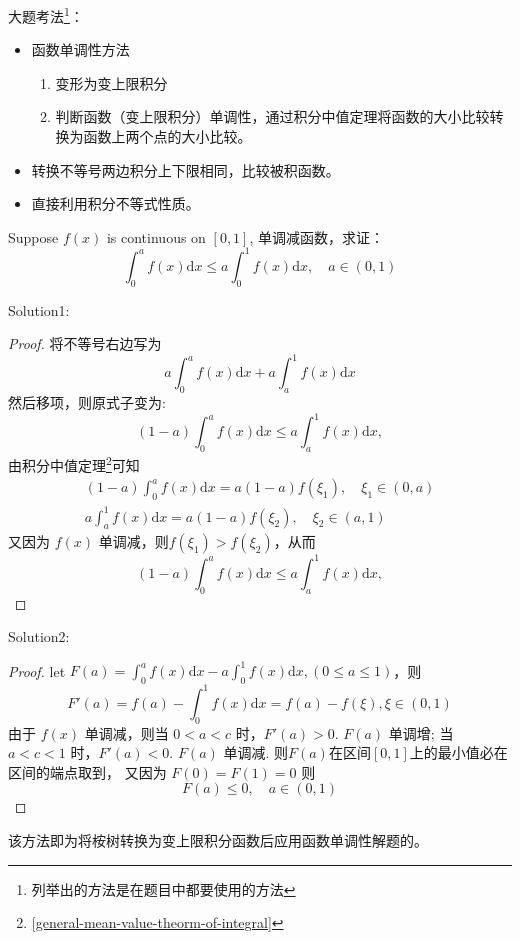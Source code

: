 大题考法\footnote{列举出的方法是在题目中都要使用的方法}：
\begin{itemize}
    \item 函数单调性方法
        \begin{enumerate}
            \item 变形为变上限积分
            \item 判断函数（变上限积分）单调性，通过积分中值定理将函数的大小比较转换为函数上两个点的大小比较。
        \end{enumerate}
    \item 转换不等号两边积分上下限相同，比较被积函数。
    \item 直接利用积分不等式性质。
\end{itemize}

\begin{example}
    Suppose $f(x)$ is continuous on $[0,1]$, 单调减函数，求证：
    \[
        \int_0^a f(x) \mathrm{d}x \leq a \int_0^1 f(x) \mathrm{d}x, \quad a \in (0, 1)
    \]
    \cite[page 119, pdf 130, example 2]{we}

    Solution1:
    \begin{proof}
        将不等号右边写为
        \[
            a\int_0^a f(x) \mathrm{d}x + a\int_a^1 f(x) \mathrm{d}x
        \]
        然后移项，则原式子变为:
        \[
            (1-a) \int_0^a f(x) \mathrm{d}x \leq a \int_a^1 f(x) \mathrm{d}x,
        \]
        由积分中值定理\footnote{\ref{general-mean-value-theorm-of-integral}}可知
        \begin{align}
            (1-a) \int_0^a f(x) \mathrm{d}x = a(1-a)f(\xi_1), \quad \xi_1 \in (0, a)\\
            a \int_a^1 f(x) \mathrm{d}x = a(1-a)f(\xi_2), \quad \xi_2 \in (a, 1)
        \end{align}
        又因为 $f(x)$ 单调减，则$f(\xi_1) > f(\xi_2)$，从而
        \[
            (1-a) \int_0^a f(x) \mathrm{d}x \leq a \int_a^1 f(x) \mathrm{d}x,
        \]
    \end{proof}

    Solution2:
    \begin{proof}
        let $F(a) = \int_0^a f(x) \mathrm{d}x - a\int_0^1 f(x) \mathrm{d}x, (0 \leq a \leq 1)$，则
        \[
            F'(a) = f(a) -  \int_0^1 f(x)\mathrm{d}x = f(a) - f(\xi), \xi \in (0,1)
        \]
        由于 $f(x)$ 单调减，则当 $0<a<c$ 时，$F'(a) > 0$.
        $F(a)$ 单调增;
        当 $a<c<1$ 时，$F'(a) < 0$.
        $F(a)$ 单调减.
        则$F(a)$在区间$[0,1]$上的最小值必在区间的端点取到，
        又因为 $F(0) = F(1) =0$ 则
        \[
            F(a) \leq 0, \quad a \in (0, 1)
        \]
    \end{proof}
    该方法即为将桉树转换为变上限积分函数后应用函数单调性解题的。
\end{example}

